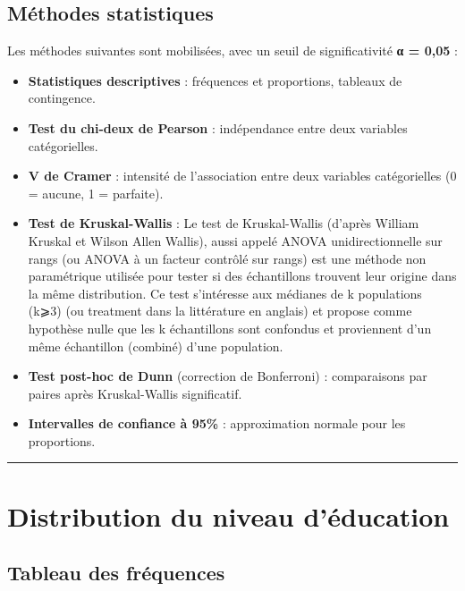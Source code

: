\documentclass[
]{article}
\providecommand{\tightlist}{%
  \setlength{\itemsep}{0pt}\setlength{\parskip}{0pt}}
\begin{document}
\subsection{Méthodes statistiques}\label{muxe9thodes-statistiques}

Les méthodes suivantes sont mobilisées, avec un seuil de significativité
\textbf{α = 0,05} :

\begin{itemize}
\tightlist
\item
  \textbf{Statistiques descriptives} : fréquences et proportions,
  tableaux de contingence.
\item
  \textbf{Test du chi-deux de Pearson} : indépendance entre deux
  variables catégorielles.
\item
  \textbf{V de Cramer} : intensité de l'association entre deux variables
  catégorielles (0 = aucune, 1 = parfaite).
\item
  \textbf{Test de Kruskal-Wallis} : Le test de Kruskal-Wallis (d'après
  William Kruskal et Wilson Allen Wallis), aussi appelé ANOVA
  unidirectionnelle sur rangs (ou ANOVA à un facteur contrôlé sur rangs)
  est une méthode non paramétrique utilisée pour tester si des
  échantillons trouvent leur origine dans la même distribution. Ce test
  s'intéresse aux médianes de k populations (k⩾3) (ou treatment dans la
  littérature en anglais) et propose comme hypothèse nulle que les k
  échantillons sont confondus et proviennent d'un même échantillon
  (combiné) d'une population.
\item
  \textbf{Test post-hoc de Dunn} (correction de Bonferroni) :
  comparaisons par paires après Kruskal-Wallis significatif.
\item
  \textbf{Intervalles de confiance à 95\%} : approximation normale pour
  les proportions.
\end{itemize}

\begin{center}\rule{0.5\linewidth}{0.5pt}\end{center}

\section{Distribution du niveau
d'éducation}\label{distribution-du-niveau-duxe9ducation}

\subsection{Tableau des fréquences}\label{tableau-des-fruxe9quences}
\end{document}
